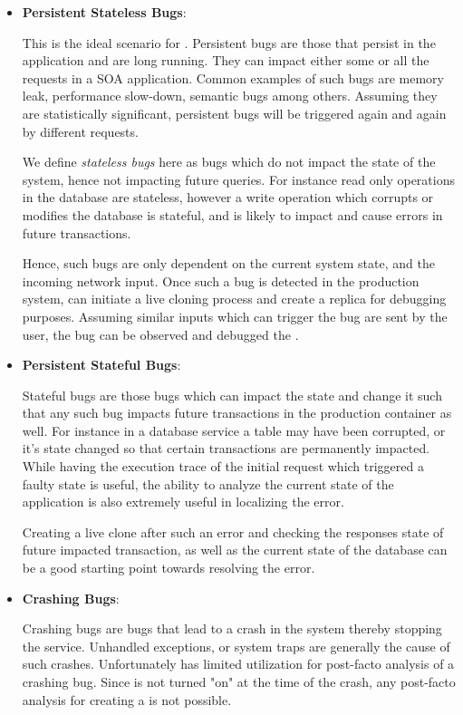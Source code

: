 \begin{itemize}
	
	\item \textbf{Persistent Stateless Bugs}: 
	
	This is the ideal scenario for \parikshan.
	Persistent bugs are those that persist in the application and are long running. 
	They can impact either some or all the requests in a SOA application.
	Common examples of such bugs are memory leak, performance slow-down, semantic bugs among others.
	Assuming they are statistically significant, persistent bugs will be triggered again and again by different requests.
	
	We define \emph{stateless bugs} here as bugs which do not impact the state of the system, hence not impacting future queries. 
	For instance read only operations in the database are stateless, however a write operation which corrupts or modifies the database is stateful, and is likely to impact and cause errors in future transactions.
	
	Hence, such bugs are only dependent on the current system state, and the incoming network input.
	Once such a bug is detected in the production system, \parikshan can initiate a live cloning process and create a replica for debugging purposes. 
	Assuming similar inputs which can trigger the bug are sent by the user, the bug can be observed and debugged the \debugcontainer.
	
	\item \textbf{Persistent Stateful Bugs}:
	
	Stateful bugs are those bugs which can impact the state and change it such that any such bug impacts future transactions in the production container as well.
	For instance in a database service a table may have been corrupted, or it's state changed so that certain transactions are permanently impacted. 
	While having the execution trace of the initial request which triggered a faulty state is useful, the ability to analyze the current state of the application is also extremely useful in localizing the error.
	
	Creating a live clone after such an error and checking the responses state of future impacted transaction, as well as the current state of the database can be a good starting point towards resolving the error. 
	
	\item \textbf{Crashing Bugs}: 
	
	Crashing bugs are bugs that lead to a crash in the system thereby stopping the service.
	Unhandled exceptions, or system traps are generally the cause of such crashes.
	Unfortunately \parikshan has limited utilization for post-facto analysis of a crashing bug. 
	Since \parikshan is not turned "on" at the time of the crash, any post-facto analysis for creating a \debugcontainer is not possible.

	
\end{itemize} 

